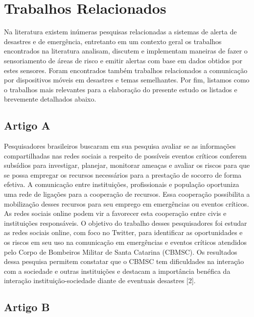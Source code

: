 \documentclass[conference]{IEEEtran}
\begin{document}
\section{Trabalhos Relacionados}

Na literatura existem inúmeras pesquisas relacionadas a sistemas de alerta de desastres e de emergência, entretanto em um contexto geral os trabalhos encontrados na literatura analisam, discutem e implementam maneiras de fazer o sensoriamento de áreas de risco e emitir alertas com base em dados obtidos por estes sensores. Foram encontrados também trabalhos relacionados a comunicação por dispositivos móveis em desastres e temas semelhantes. Por fim, listamos como o trabalhos mais relevantes para a elaboração do presente estudo os listados e brevemente detalhados abaixo.

\subsection{Artigo A}

Pesquisadores brasileiros buscaram em sua pesquisa avaliar se as informações compartilhadas nas redes sociais a respeito de possíveis eventos críticos conferem subsídios para investigar, planejar, monitorar ameaças  e  avaliar  os  riscos  para que se possa empregar  os  recursos necessários para a prestação de socorro de  forma  efetiva. A comunicação entre instituições, profissionais e população oportuniza uma rede de ligações para a cooperação de recursos. Essa cooperação possibilita a mobilização desses recursos para seu emprego em emergências ou eventos críticos. As redes sociais online podem vir a favorecer esta cooperação entre civis e instituições responsáveis. O objetivo do trabalho desses pesquisadores foi estudar as redes sociais online, com foco no Twitter, para identificar as oportunidades e os riscos em seu uso na comunicação em emergências e eventos críticos atendidos pelo Corpo de Bombeiros Militar de Santa Catarina (CBMSC). Os resultados dessa pesquisa permitem constatar que o CBMSC tem dificuldades na interação com a sociedade e outras instituições e destacam a importância benéfica da interação instituição-sociedade diante de eventuais desastres [2].

\subsection{Artigo B}
\end{document}
